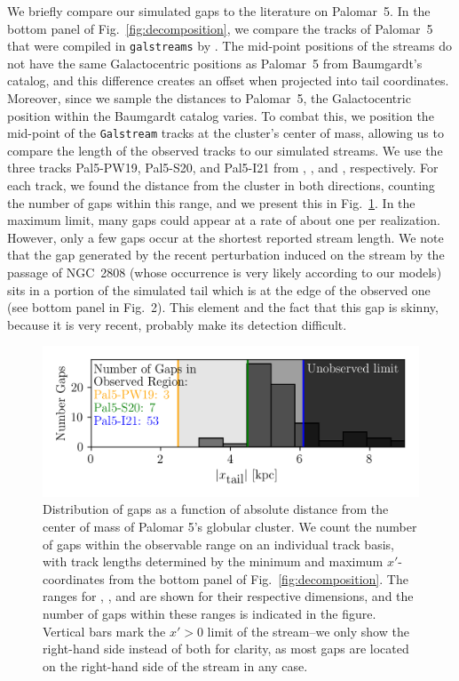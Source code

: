         We briefly compare our simulated gaps to the literature on Palomar~5. In the bottom panel of Fig.~\ref{fig:decomposition}, we compare the tracks of Palomar~5 that were compiled in \texttt{galstreams} by \citet{2023MNRAS.520.5225M}. The mid-point positions of the streams do not have the same Galactocentric positions as Palomar~5 from Baumgardt's catalog, and this difference creates an offset when projected into tail coordinates. Moreover, since we sample the distances to Palomar~5, the Galactocentric position within the Baumgardt catalog varies. To combat this, we position the mid-point of the \texttt{Galstream} tracks at the cluster's center of mass, allowing us to compare the length of the observed tracks to our simulated streams. We use the three tracks Pal5-PW19, Pal5-S20, and Pal5-I21 from \citet{2019AJ....158..223P}, \citet{2020MNRAS.495.2222S}, and \citet{2021ApJ...914..123I}, respectively. For each track, we found the distance from the cluster in both directions, counting the number of gaps within this range, and we present this in Fig.~\ref{fig:GapsWithinSight}. In the maximum limit, many gaps could appear at a rate of about one per realization. However, only a few gaps occur at the shortest reported stream length. We note that the gap generated by the recent perturbation induced on the stream by the passage of NGC~2808 (whose occurrence is very likely according to our models) sits in a portion of the simulated tail which is at the edge of the observed one (see bottom panel in Fig.~2). This element and the fact that this gap is skinny, because it is very recent, probably make its detection difficult. 
        \begin{figure}
            \centering
            \includegraphics[width=\linewidth]{images/GapWithinSight.png}
            \caption{Distribution of gaps as a function of absolute distance from the center of mass of Palomar 5's globular cluster. We count the number of gaps within the observable range on an individual track basis, with track lengths determined by the minimum and maximum $x'$-coordinates from the bottom panel of Fig.~\ref{fig:decomposition}. The ranges for \citet{2019AJ....158..223P}, \citet{2020MNRAS.495.2222S}, and \citet{2021ApJ...914..123I} are shown for their respective dimensions, and the number of gaps within these ranges is indicated in the figure. Vertical bars mark the $x' > 0$ limit of the stream--we only show the right-hand side instead of both for clarity, as most gaps are located on the right-hand side of the stream in any case. }
            \label{fig:GapsWithinSight}
        \end{figure}

